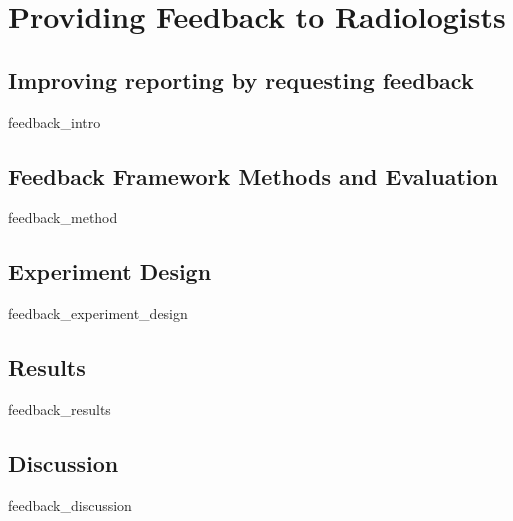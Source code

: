 \chapter{Providing Feedback to Radiologists}

\section{Improving reporting by requesting feedback}
{feedback_intro}
\clearpage

\section{Feedback Framework Methods and Evaluation}
{feedback_method}
\clearpage

\section{Experiment Design}
{feedback_experiment_design}
\clearpage

\section{Results}
{feedback_results}
\clearpage

\section{Discussion}
{feedback_discussion}